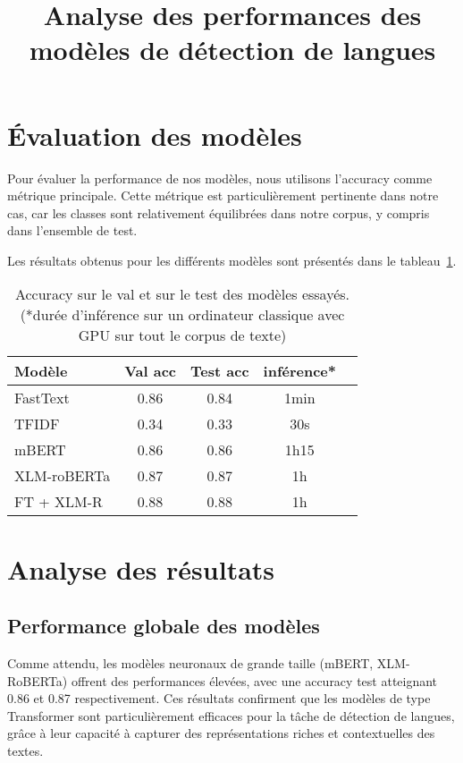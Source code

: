 

\title{Analyse des performances des modèles de détection de langues}
\author{}
\date{}
\maketitle

\section{Évaluation des modèles}

Pour évaluer la performance de nos modèles, nous utilisons l'accuracy comme métrique principale. Cette métrique est particulièrement pertinente dans notre cas, car les classes sont relativement équilibrées dans notre corpus, y compris dans l'ensemble de test.

Les résultats obtenus pour les différents modèles sont présentés dans le tableau~\ref{tab:results}.

\begin{table}[ht]
    \centering
    \begin{tabular}{lcccc}
        \toprule
        Modèle & Val acc & Test acc  & inférence* \\
        \midrule
        FastText & 0.86 & 0.84 & 1min \\
        TFIDF & 0.34 & 0.33 & 30s \\
        mBERT & 0.86 & 0.86 & 1h15 \\
        XLM-roBERTa & 0.87 & 0.87 & 1h \\
        FT + XLM-R & 0.88 & 0.88 & 1h \\
        \bottomrule
    \end{tabular}

    \caption{Accuracy sur le val et sur le test des modèles essayés. (*durée d'inférence sur un ordinateur classique avec GPU sur tout le corpus de texte)}
    
    \label{tab:results}
\end{table}

\section{Analyse des résultats}

\subsection{Performance globale des modèles}

Comme attendu, les modèles neuronaux de grande taille (mBERT, XLM-RoBERTa) offrent des performances élevées, avec une accuracy test atteignant 0.86 et 0.87 respectivement. Ces résultats confirment que les modèles de type Transformer sont particulièrement efficaces pour la tâche de détection de langues, grâce à leur capacité à capturer des représentations riches et contextuelles des textes.

